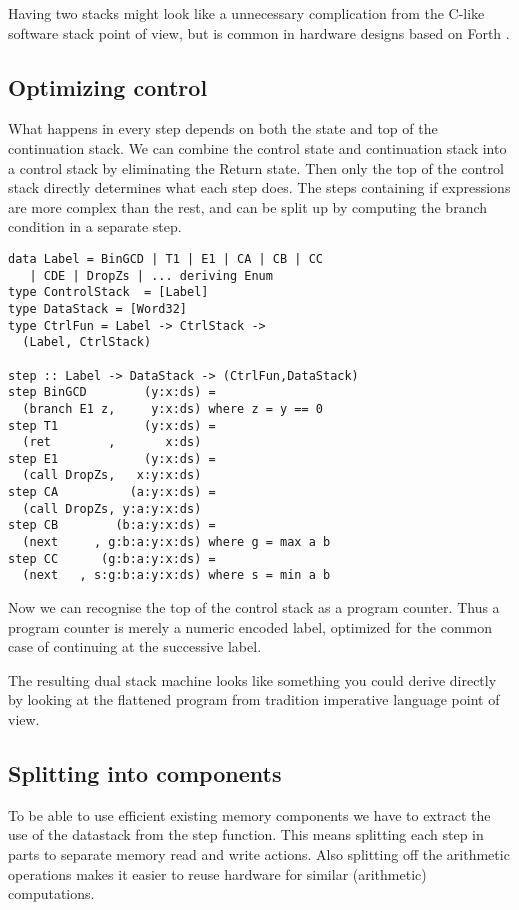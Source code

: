 \documentclass[preprint]{sigplanconf}
\begin{document}
Having two stacks might look like a unnecessary complication from the C-like software stack point of view, but is common in hardware designs based on Forth \cite{LaForest}.

\subsection{Optimizing control}
What happens in every step depends on both the state and top of the continuation stack.
We can combine the control state and continuation stack into a control stack by eliminating the Return state.
Then only the top of the control stack directly determines what each step does.
The steps containing if expressions are more complex than the rest, and can be split up by computing the branch condition in a separate step.

\begin{lstlisting}
data Label = BinGCD | T1 | E1 | CA | CB | CC
   | CDE | DropZs | ... deriving Enum
type ControlStack  = [Label]
type DataStack = [Word32]
type CtrlFun = Label -> CtrlStack -> 
  (Label, CtrlStack)

step :: Label -> DataStack -> (CtrlFun,DataStack)
step BinGCD        (y:x:ds) =
  (branch E1 z,     y:x:ds) where z = y == 0
step T1            (y:x:ds) = 
  (ret        ,       x:ds)
step E1            (y:x:ds) = 
  (call DropZs,   x:y:x:ds)
step CA          (a:y:x:ds) = 
  (call DropZs, y:a:y:x:ds)
step CB        (b:a:y:x:ds) = 
  (next     , g:b:a:y:x:ds) where g = max a b
step CC      (g:b:a:y:x:ds) = 
  (next   , s:g:b:a:y:x:ds) where s = min a b
\end{lstlisting}

Now we can recognise the top of the control stack as a program counter.
Thus a program counter is merely a numeric encoded label, optimized for the common case of continuing at the successive label.

The resulting dual stack machine looks like something you could derive directly by looking at the flattened program from tradition imperative language point of view.

\subsection{Splitting into components}
To be able to use efficient existing memory components we have to extract the use of the datastack from the step function.
This means splitting each step in parts to separate memory read and write actions.
Also splitting off the arithmetic operations makes it easier to reuse hardware for similar (arithmetic) computations.
\end{document}
